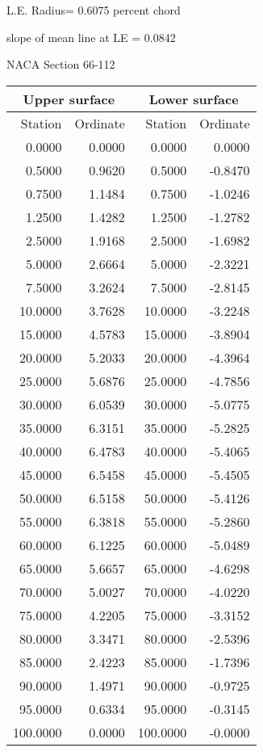 \documentclass[11pt]{book}
\begin{document}
L.E. Radius=  0.6075 percent chord


 slope of mean line at LE =  0.0842
 \newpage
  \label{s66-112}
 \begin{Large}
 NACA Section 66-112
 \end{Large}
  
 \vspace{8mm}
 \begin{tabular}{|r|r|r|r|} \hline 
 \multicolumn{2}{|c|}{Upper surface} & \multicolumn{2}{|c|}{Lower surface} \\
 \hline
 Station & Ordinate & Station & Ordinate \\
 \hline
0.0000 & 0.0000 & 0.0000 & 0.0000 \\
0.5000 & 0.9620 & 0.5000 & -0.8470 \\
0.7500 & 1.1484 & 0.7500 & -1.0246 \\
1.2500 & 1.4282 & 1.2500 & -1.2782 \\
2.5000 & 1.9168 & 2.5000 & -1.6982 \\
5.0000 & 2.6664 & 5.0000 & -2.3221 \\
7.5000 & 3.2624 & 7.5000 & -2.8145 \\
10.0000 & 3.7628 & 10.0000 & -3.2248 \\
15.0000 & 4.5783 & 15.0000 & -3.8904 \\
20.0000 & 5.2033 & 20.0000 & -4.3964 \\
25.0000 & 5.6876 & 25.0000 & -4.7856 \\
30.0000 & 6.0539 & 30.0000 & -5.0775 \\
35.0000 & 6.3151 & 35.0000 & -5.2825 \\
40.0000 & 6.4783 & 40.0000 & -5.4065 \\
45.0000 & 6.5458 & 45.0000 & -5.4505 \\
50.0000 & 6.5158 & 50.0000 & -5.4126 \\
55.0000 & 6.3818 & 55.0000 & -5.2860 \\
60.0000 & 6.1225 & 60.0000 & -5.0489 \\
65.0000 & 5.6657 & 65.0000 & -4.6298 \\
70.0000 & 5.0027 & 70.0000 & -4.0220 \\
75.0000 & 4.2205 & 75.0000 & -3.3152 \\
80.0000 & 3.3471 & 80.0000 & -2.5396 \\
85.0000 & 2.4223 & 85.0000 & -1.7396 \\
90.0000 & 1.4971 & 90.0000 & -0.9725 \\
95.0000 & 0.6334 & 95.0000 & -0.3145 \\
100.0000 & 0.0000 & 100.0000 & -0.0000 \\
 \hline 
 \end{tabular}
\end{document}
